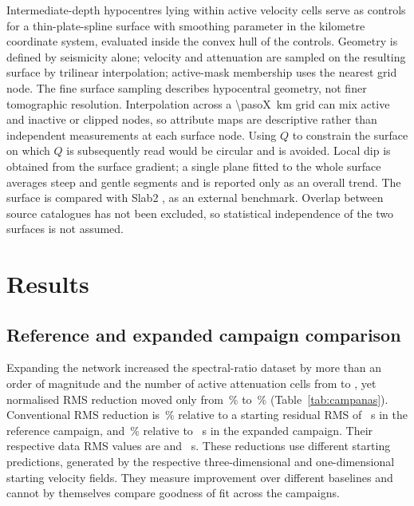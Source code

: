 \documentclass[review,authoryear,longtitle]{elsarticle}
\begin{document}
Intermediate-depth hypocentres lying within active velocity cells serve as
controls for a thin-plate-spline surface with smoothing parameter
\suavizadoLosa{} in the kilometre coordinate system, evaluated inside the convex hull
of the controls. Geometry is defined by seismicity alone; velocity and
attenuation are sampled on the resulting surface by trilinear
interpolation; active-mask membership uses the nearest grid node.
The fine surface sampling describes hypocentral geometry, not finer
tomographic resolution. Interpolation across a \SI{\pasoX}{\kilo\metre}
grid can mix active and inactive or clipped nodes, so attribute maps
are descriptive rather than independent measurements at each surface node. Using $Q$
to constrain the surface on which $Q$ is subsequently read would be
circular and is avoided. Local dip is obtained from the surface gradient;
a single plane fitted to the whole surface averages steep and gentle
segments and is reported only as an overall trend. The surface is compared
with Slab2 \citep{Hayes2018Slab2}, as an external benchmark. Overlap between source catalogues has not been
excluded, so statistical independence of the two surfaces is not assumed.

\section{Results}

\subsection{Reference and expanded campaign comparison}
\label{sec:cobertura}

Expanding the network increased the spectral-ratio dataset by more than an
order of magnitude and the number of active attenuation cells from
\qCeldasPrevia{} to \qCeldasMascaraVieja, yet normalised RMS reduction moved
only from \explPrevia\,\% to \explMascaraVieja\,\%
(Table~\ref{tab:campanas}). Conventional RMS reduction is
\rmsRedGuionPrevia\,\% relative to a starting residual RMS of
\auditReferenceInitialRms~s in the reference campaign, and
\rmsRedGuionMascaraVieja\,\% relative to
\auditExpandedInitialRms~s in the expanded campaign. Their respective
data RMS values are \auditReferenceDataRms{} and
\auditExpandedDataRms~s. These reductions use different starting
predictions, generated by the respective three-dimensional and
one-dimensional starting velocity fields. They measure improvement over
different baselines and cannot by themselves compare goodness of fit
across the campaigns.
\end{document}

